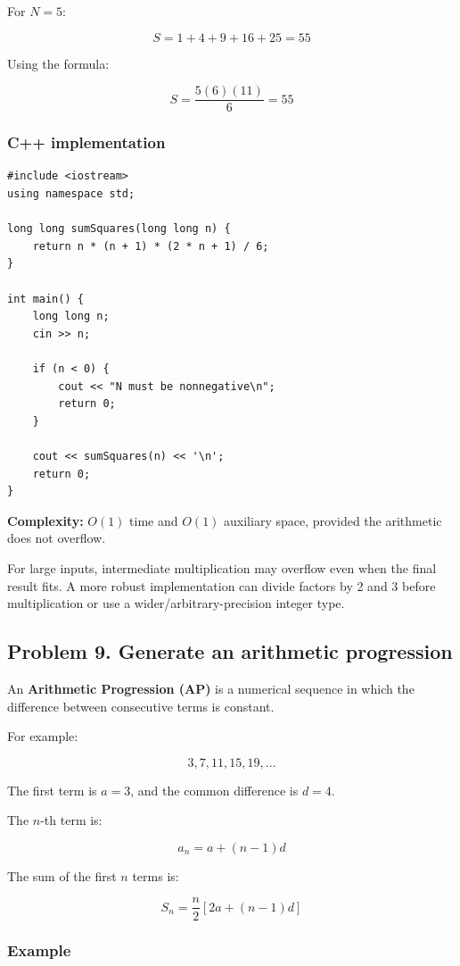 For $N=5$:


\[
S=1+4+9+16+25=55
\]


Using the formula:


\[
S=\frac{5(6)(11)}6=\boxed{55}
\]


\subsubsection{C++ implementation}

\begin{lstlisting}[style=cppstyle]
#include <iostream>
using namespace std;

long long sumSquares(long long n) {
    return n * (n + 1) * (2 * n + 1) / 6;
}

int main() {
    long long n;
    cin >> n;

    if (n < 0) {
        cout << "N must be nonnegative\n";
        return 0;
    }

    cout << sumSquares(n) << '\n';
    return 0;
}
\end{lstlisting}

\textbf{Complexity:} $O(1)$ time and $O(1)$ auxiliary space, provided the arithmetic does not overflow.

For large inputs, intermediate multiplication may overflow even when the final result fits. A more robust implementation can divide factors by 2 and 3 before multiplication or use a wider/arbitrary-precision integer type.

\subsection{Problem 9. Generate an arithmetic progression}

An \textbf{Arithmetic Progression (AP)} is a numerical sequence in which the difference between consecutive terms is constant.

For example:


\[
3,7,11,15,19,\ldots
\]


The first term is $a=3$, and the common difference is $d=4$.

The $n$-th term is:


\[
\boxed{a_n=a+(n-1)d}
\]


The sum of the first $n$ terms is:


\[
\boxed{S_n=\frac n2\left[2a+(n-1)d\right]}
\]


\subsubsection{Example}

